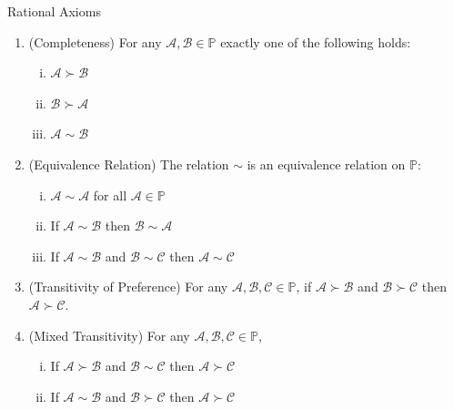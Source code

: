 \documentclass[10pt,handout]{beamer}
\theoremstyle{definition}
\begin{document}
\begin{frame}{Rational Axioms}
  \begin{enumerate}[<+->]
  \item (Completeness)
    For any $\mathcal{A}, \mathcal{B} \in \mathbb{P}$ exactly one of the following holds:
    \vspace{-3mm}
    \begin{multicols}{3}
      \begin{enumerate}[(i)]
        \item $\mathcal{A} \succ \mathcal{B}$
        \item $\mathcal{B} \succ \mathcal{A}$
        \item $\mathcal{A} \sim \mathcal{B}$
      \end{enumerate}
    \end{multicols}
    \vspace{-3mm}

  \item (Equivalence Relation)
    The relation $\sim$ is an equivalence relation on $\mathbb{P}$:
    \vspace{-3mm}
    \begin{multicols}{2}
    \begin{enumerate}[(i)]
      \item $\mathcal{A} \sim \mathcal{A}$ for all $\mathcal{A} \in \mathbb{P}$
      \item If $\mathcal{A} \sim \mathcal{B}$ then $\mathcal{B} \sim \mathcal{A}$
      \item If $\mathcal{A} \sim \mathcal{B}$ and $\mathcal{B} \sim \mathcal{C}$ then $\mathcal{A} \sim \mathcal{C}$
    \end{enumerate}
  \end{multicols}
    \vspace{-3mm}

  \item (Transitivity of Preference)
    For any $\mathcal{A}, \mathcal{B}, \mathcal{C} \in \mathbb{P}$, if $\mathcal{A} \succ \mathcal{B}$ and $\mathcal{B} \succ \mathcal{C}$ then $\mathcal{A} \succ \mathcal{C}$.

  \item (Mixed Transitivity)
    For any $\mathcal{A}, \mathcal{B}, \mathcal{C} \in \mathbb{P}$,
    \begin{enumerate}[(i)]
      \item If $\mathcal{A} \succ \mathcal{B}$ and $\mathcal{B} \sim \mathcal{C}$ then $\mathcal{A} \succ \mathcal{C}$
      \item If $\mathcal{A} \sim \mathcal{B}$ and $\mathcal{B} \succ \mathcal{C}$ then $\mathcal{A} \succ \mathcal{C}$
    \end{enumerate}


\end{enumerate}
\end{frame}
\end{document}
